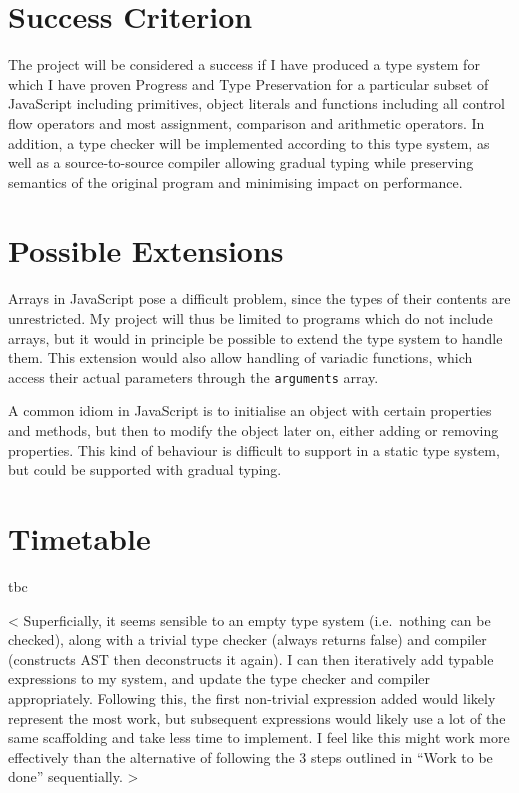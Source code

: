 \section{Success Criterion}\label{success-criterion}

The project will be considered a success if I have produced a type
system for which I have proven Progress and Type Preservation for a
particular subset of JavaScript including primitives, object literals
and functions including all control flow operators and most assignment,
comparison and arithmetic operators. In addition, a type checker will be
implemented according to this type system, as well as a source-to-source
compiler allowing gradual typing while preserving semantics of the
original program and minimising impact on performance.

\section{Possible Extensions}\label{possible-extensions}

Arrays in JavaScript pose a difficult problem, since the types of their
contents are unrestricted. My project will thus be limited to programs
which do not include arrays, but it would in principle be possible to
extend the type system to handle them. This extension would also allow
handling of variadic functions, which access their actual parameters
through the \texttt{arguments} array.

A common idiom in JavaScript is to initialise an object with certain
properties and methods, but then to modify the object later on, either
adding or removing properties. This kind of behaviour is difficult to
support in a static type system, but could be supported with gradual
typing.

\section{Timetable}\label{timetable}

tbc

\textless{} Superficially, it seems sensible to an empty type system
(i.e.~nothing can be checked), along with a trivial type checker (always
returns false) and compiler (constructs AST then deconstructs it again).
I can then iteratively add typable expressions to my system, and update
the type checker and compiler appropriately. Following this, the first
non-trivial expression added would likely represent the most work, but
subsequent expressions would likely use a lot of the same scaffolding
and take less time to implement. I feel like this might work more 
effectively than the alternative of following the 3 steps outlined in
``Work to be done'' sequentially. \textgreater{}





